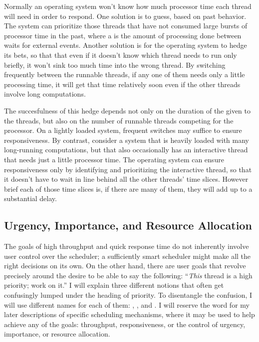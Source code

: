 Normally an operating system won't know how much processor time each
thread will need in order to respond.  One solution is to guess, based
on past behavior.  The system can prioritize those threads that have not consumed
large bursts of processor time in the past, where a  is
the amount of processing done between waits for external events.
Another solution is for
the operating system to hedge its bets, so that that even if it
doesn't know which thread needs to run only briefly, it won't sink too
much time into the wrong thread.  By switching frequently between the
runnable threads, if any one of them needs only a little processing time,
it will get that time relatively soon even if the other threads
involve long computations.

The succesfulness of this hedge depends not only on the duration of
the  given to the threads, but also on the number of runnable
threads competing for the processor.  On a lightly loaded system,
frequent switches may suffice to ensure responsiveness.  By contrast,
consider a system that is heavily loaded with many long-running
computations, but that also occasionally has an interactive thread that
needs just a little processor time.  The operating system can 
ensure responsiveness only by identifying and prioritizing the interactive
thread, so that it doesn't have to wait in line behind all the other
threads' time slices.  However brief each of those time slices is, if
there are many of them, they will add up to a substantial delay.

\subsection{Urgency, Importance, and Resource Allocation}\label{uira-section}

The goals of high throughput and quick response time do not inherently
involve user control over the scheduler; a sufficiently smart
scheduler might make all the right decisions on its own.  On the other
hand, there are user goals that revolve precisely around the desire to
be able to say the following: ``{\em This} thread is a high priority; work on it.''
I will explain three different notions that often get
confusingly lumped under the heading of priority.  To disentangle
the confusion, I will use different names for each of
them: , , and .  I will reserve
the word  for my later descriptions of specific
scheduling mechanisms, where it may be used to help achieve any of the
goals: throughput, responsiveness, or the control of urgency, importance,
or resource allocation.

